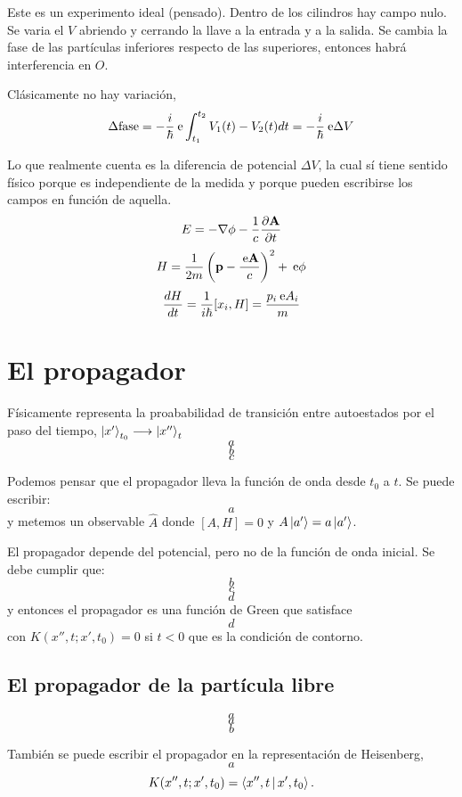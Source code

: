 \documentclass[10pt,oneside]{CBFT_book}
\begin{document}
Este es un experimento ideal (pensado). Dentro de los cilindros hay campo nulo. Se varia el $V$ abriendo y cerrando la 
llave a la entrada y a la salida.
Se cambia la fase de las partículas inferiores respecto de las superiores, entonces habrá interferencia en $O$.

Clásicamente no hay variación,
\[
	\Delta \text{fase} = -\frac{i}{\hbar}\:\mathrm{e} \int _{t_1}^{t_2} V_1(t) - V_2(t) dt = 
	-\frac{i}{\hbar}\:\mathrm{e} \Delta V
\]

Lo que realmente cuenta es la diferencia de potencial $\Delta V$, la cual sí tiene sentido físico porque es 
independiente de la medida y porque pueden escribirse los campos en función de aquella.
\[
	E = - \Nabla\phi - \frac{1}{c}\dpar{\vb{A}}{t}
\]
\[
	H = \frac{1}{2m} \left( \vb{p} - \frac{\euler\vb{A}}{c}\right)^2 + \euler\phi 
\]
\[
	\frac{d^{\hspace{-0.05em}} {H}}{d {t}^{\hspace{-0.05em}}} = \frac{1}{i\hbar}[x_i,H] = \frac{p_i  \:\mathrm{e} A_i}{m}
\]

\section{El propagador}

Físicamente representa la proababilidad de transición entre autoestados por el paso del tiempo,
$ \Ket{x'}_{t_0} \longrightarrow \Ket{x''}_t$
\[
	a
\]
\[
	b
\]
\[
	c
\]

Podemos pensar que el propagador lleva la función de onda desde $t_0$ a $t$. Se puede escribir:
\[
	a
\]
y metemos un observable $\hat{A}$ donde $[A,H]=0$ y $A\Ket{a'}=a\Ket{a'}$.

El propagador depende del potencial, pero no de la función de onda inicial. Se debe cumplir que:
\[
	b
\]
\[
	c
\]
\[
	d
\]
y entonces el propagador es una función de Green que satisface 
\[
	d
\]
con $K(x'',t;x',t_0)=0 $ si $t<0$ que es la condición de contorno.

\subsection{El propagador de la partícula libre}

\[
	a
\]
\[
	a
\]
\[
	b
\]

También se puede escribir el propagador en la representación de Heisenberg,
\[
	a
\]
\[
	K(x'',t;x',t_0) = \Braket{x'',t | x',t_0}.
\]
\end{document}
